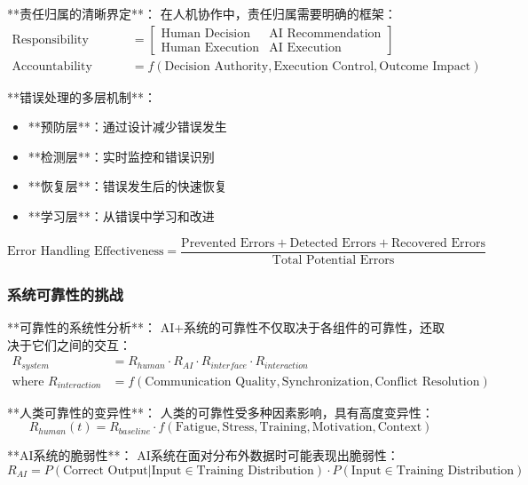 **责任归属的清晰界定**：
在人机协作中，责任归属需要明确的框架：
\begin{align}
\text{Responsibility Matrix} &= \begin{bmatrix}
\text{Human Decision} & \text{AI Recommendation} \\
\text{Human Execution} & \text{AI Execution}
\end{bmatrix} \\
\text{Accountability} &= f(\text{Decision Authority}, \text{Execution Control}, \text{Outcome Impact})
\end{align}

**错误处理的多层机制**：
\begin{itemize}
\item **预防层**：通过设计减少错误发生
\item **检测层**：实时监控和错误识别
\item **恢复层**：错误发生后的快速恢复
\item **学习层**：从错误中学习和改进
\end{itemize}

\begin{equation}
\text{Error Handling Effectiveness} = \frac{\text{Prevented Errors} + \text{Detected Errors} + \text{Recovered Errors}}{\text{Total Potential Errors}}
\end{equation}

\subsubsection{系统可靠性的挑战} %

**可靠性的系统性分析**：
AI+系统的可靠性不仅取决于各组件的可靠性，还取决于它们之间的交互：
\begin{align}
R_{system} &= R_{human} \cdot R_{AI} \cdot R_{interface} \cdot R_{interaction} \\
\text{where } R_{interaction} &= f(\text{Communication Quality}, \text{Synchronization}, \text{Conflict Resolution})
\end{align}

**人类可靠性的变异性**：
人类的可靠性受多种因素影响，具有高度变异性：
\begin{equation}
R_{human}(t) = R_{baseline} \cdot f(\text{Fatigue}, \text{Stress}, \text{Training}, \text{Motivation}, \text{Context})
\end{equation}

**AI系统的脆弱性**：
AI系统在面对分布外数据时可能表现出脆弱性：
\begin{equation}
R_{AI} = P(\text{Correct Output} | \text{Input} \in \text{Training Distribution}) \cdot P(\text{Input} \in \text{Training Distribution})
\end{equation}

